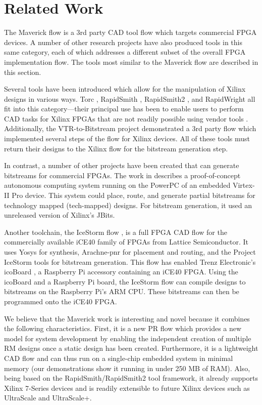 \section{Related Work}
\label{sec:background}

The Maverick flow is a 3rd party CAD tool flow which targets commercial FPGA devices.
A number of other research projects have also produced tools in this same category, each of which addresses a different subset of the overall FPGA implementation flow.  
The tools most similar to the Maverick flow are described in this section.

Several tools have been introduced which allow for the manipulation of Xilinx designs in various ways.
Torc \cite{Steiner:2011}, RapidSmith \cite{Lavin:2011}, RapidSmith2 \cite{Haroldsen:2015}, and RapidWright \cite{Lavin:2018} all fit into this category---their principal use has been to enable users to perform CAD tasks for Xilinx FPGAs that are not readily possible using vendor tools \cite{Petelin:2016} \cite{Cannon:2018}.
Additionally, the VTR-to-Bitstream \cite{Hung:2015} project demonstrated  a 3rd party flow which implemented several steps of the flow for Xilinx devices.
All of these tools must return their designs to the Xilinx flow for the bitstream generation step.

In contrast, a number of other projects have been created that can generate bitstreams for commercial FPGAs.
The work in \cite{Steiner:2008} describes a proof-of-concept autonomous computing system running on the PowerPC of an embedded Virtex-II Pro device.
This system could place, route, and generate partial bitstreams for technology mapped (tech-mapped) designs. 
For bitstream generation, it used an unreleased version of Xilinx's JBits.

Another toolchain, the IceStorm flow \cite{IceStorm}, is a full FPGA CAD flow for the commercially available iCE40 family of FPGAs from Lattice Semiconductor.
It uses Yosys \cite{Wolf:2013} for synthesis, Arachne-pnr \cite{Arachne-pnr} for placement and routing, and the Project IceStorm tools for bitstream generation.
This flow has enabled Trenz Electronic's icoBoard \cite{icoBoard}, a Raspberry Pi accessory containing an iCE40 FPGA.
Using the icoBoard and a Raspberry Pi board, the IceStorm flow can compile designs to bitstreams on the Raspberry Pi's ARM CPU.
These bitstreams can then be programmed onto the iCE40 FPGA.

We believe that the Maverick work is interesting and novel because it combines the following characteristics.
First, it is a new PR flow which provides a new model for system development by enabling the independent creation of multiple RM designs once a static design has been created.
Furthermore, it is a lightweight CAD flow and can thus run on a single-chip embedded system in minimal memory (our demonstrations show it running in under 250 MB of RAM).
Also, being based on the RapidSmith/RapidSmith2 tool framework, it already supports Xilinx 7-Series devices and is readily extensible to future Xilinx devices such as UltraScale and UltraScale+.